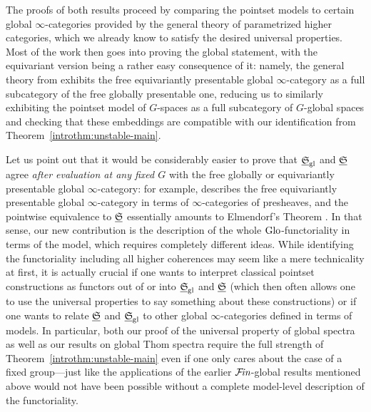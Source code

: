 \documentclass[reqno]{memo-l}
\theoremstyle{mythm}
\theoremstyle{definition}
\numberwithin{equation}{section}
\newcommand{\gl}{\textup{gl}}
\newcommand{\Fin}{\hbox{$\mathcal F\kern-1.7pt\textit{in}$}}
\newcommand{\Glo}{\textup{Glo}}
\newcommand{\ulhelper}[2]{\underline{\setbox0=\hbox{$#1#2$}\dp0=0.4pt \box0\relax}}
\newcommand{\ul}[1]{{\mathpalette\ulhelper{#1}}\hbox{\rule[-2pt]{0pt}{0pt}}}
\newcommand{\myS}{{{\mathfrak S\kern-.4pt}}}
\begin{document}
The proofs of both results proceed by comparing the pointset models to certain global $\infty$-categories provided by the general theory of parametrized higher categories, which we already know to satisfy the desired universal properties. Most of the work then goes into proving the global statement, with the equivariant version being a rather easy consequence of it: namely, the general theory from \cite{CLL_Clefts} exhibits the free equivariantly presentable global $\infty$-category as a full subcategory of the free globally presentable one, reducing us to similarly exhibiting the pointset model of $G$-spaces as a full subcategory of $G$-global spaces and checking that these embeddings are compatible with our identification from Theorem~\ref{introthm:unstable-main}.

Let us point out that it would be considerably easier to prove that $\ul\myS_\gl$ and $\ul\myS$ agree \emph{after evaluation at any fixed $G$} with the free globally or equivariantly presentable global $\infty$-category: for example, \cite{CLL_Clefts} describes the free equivariantly presentable global $\infty$-category in terms of $\infty$-categories of presheaves, and the pointwise equivalence to $\ul\myS$ essentially amounts to Elmendorf's Theorem \cite{elmendorf}. In that sense, our new contribution is the description of the whole $\Glo$-functoriality in terms of the model, which requires completely different ideas. While identifying the functoriality including all higher coherences may seem like a mere technicality at first, it is actually crucial if one wants to interpret classical pointset constructions as functors out of or into $\ul\myS_\gl$ and $\ul\myS$ (which then often allows one to use the universal properties to say something about these constructions) or if one wants to relate $\ul\myS$ and $\ul\myS_\gl$ to other global $\infty$-categories defined in terms of models. In particular, both our proof of the universal property of global spectra as well as our results on global Thom spectra require the full strength of Theorem~\ref{introthm:unstable-main} even if one only cares about the case of a fixed group---just like the applications \cites{CHLL_NRings,LLP,swan} of the earlier $\Fin$-global results  mentioned above would not have been possible without a complete model-level description of the functoriality.
\end{document}
